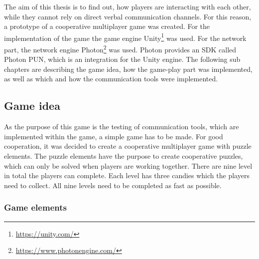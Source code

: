 The aim of this thesis is to find out, how players are interacting with each other, while they cannot rely on direct verbal communication channels.
For this reason, a prototype of a cooperative multiplayer game was created.
For the implementation of the game the game engine Unity\footnote{\url{https://unity.com/}}
was used. 
For the network part, the network engine Photon\footnote{\url{https://www.photonengine.com/}} was used. Photon provides an SDK called Photon PUN, which is an integration for the Unity engine.
The following sub chapters are describing the game idea, how the game-play part was implemented, as well as which and how the communication tools were implemented.



\subsection{Game idea}
\label{section:Game idea}
As the purpose of this game is the testing of communication tools, which are implemented within the game, a simple game has to be made.
For good cooperation, it was decided to create a cooperative multiplayer game with puzzle elements. The puzzle elements have the purpose to create cooperative puzzles, which can only be solved when players are working together. There are nine level in total the players can complete. Each level has three candies which the players need to collect. All nine levels need to be completed as fast as possible.

\subsubsection{Game elements}
\label{section:Game elements}

